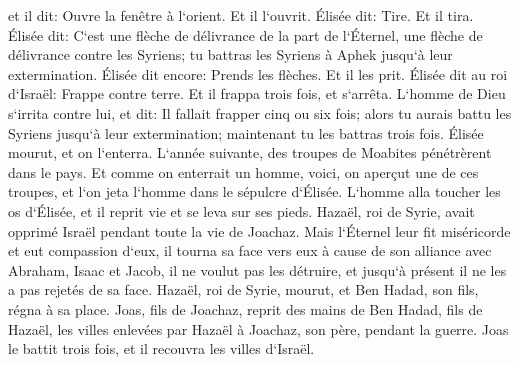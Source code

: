 \verse et il dit: Ouvre la fenêtre à l`orient. Et il l`ouvrit. Élisée dit: Tire. Et il tira. Élisée dit: C`est une flèche de délivrance de la part de l`Éternel, une flèche de délivrance contre les Syriens; tu battras les Syriens à Aphek jusqu`à leur extermination. 
\verse Élisée dit encore: Prends les flèches. Et il les prit. Élisée dit au roi d`Israël: Frappe contre terre. Et il frappa trois fois, et s`arrêta. 
\verse L`homme de Dieu s`irrita contre lui, et dit: Il fallait frapper cinq ou six fois; alors tu aurais battu les Syriens jusqu`à leur extermination; maintenant tu les battras trois fois. 
\verse Élisée mourut, et on l`enterra. L`année suivante, des troupes de Moabites pénétrèrent dans le pays. 
\verse Et comme on enterrait un homme, voici, on aperçut une de ces troupes, et l`on jeta l`homme dans le sépulcre d`Élisée. L`homme alla toucher les os d`Élisée, et il reprit vie et se leva sur ses pieds. 
\verse Hazaël, roi de Syrie, avait opprimé Israël pendant toute la vie de Joachaz. 
\verse Mais l`Éternel leur fit miséricorde et eut compassion d`eux, il tourna sa face vers eux à cause de son alliance avec Abraham, Isaac et Jacob, il ne voulut pas les détruire, et jusqu`à présent il ne les a pas rejetés de sa face. 
\verse Hazaël, roi de Syrie, mourut, et Ben Hadad, son fils, régna à sa place. 
\verse Joas, fils de Joachaz, reprit des mains de Ben Hadad, fils de Hazaël, les villes enlevées par Hazaël à Joachaz, son père, pendant la guerre. Joas le battit trois fois, et il recouvra les villes d`Israël. 

